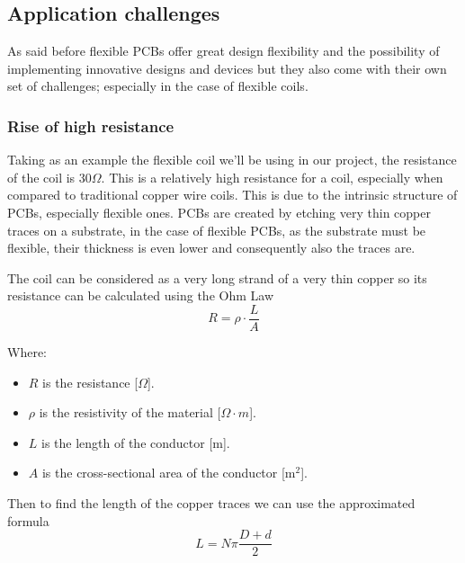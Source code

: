 \def\perm_air{4*\pi*1e-7} %
\def\spires{35}
\def\res_coil{30} %
\def\coil_ext_r{7.9e-3} %
\def\coil_int_r{1.016e-4} %



\subsection{Application challenges}
As said before flexible PCBs offer great design flexibility and the possibility of implementing innovative designs and devices but they also come with their own set of challenges; especially in the case of flexible coils.

\subsubsection{Rise of high resistance}
Taking as an example the flexible coil we'll be using in our project, the resistance of the coil is 30\(\Omega\). This is a relatively high resistance for a coil, especially when compared to traditional copper wire coils. 
This is due to the intrinsic structure of PCBs, especially flexible ones.
PCBs are created by etching very thin copper traces on a substrate, in the case of flexible PCBs, as the substrate must be flexible, their thickness is even lower and consequently also the traces are.

The coil can be considered as a very long strand of a very thin copper so its resistance can be calculated using the Ohm Law
\begin{equation}
    R=\rho \cdot \frac{L}{A}
\end{equation}

Where:
\begin{itemize}
    \item \( R \) is the resistance [\(\Omega\)].
    \item \( \rho \) is the resistivity of the material [\(\Omega \cdot m\)].
    \item \( L \) is the length of the conductor [m].
    \item \( A \) is the cross-sectional area of the conductor [m\(^2\)].
\end{itemize}

Then to find the length of the copper traces we can use the approximated formula \cite{Length_of_a_Spiral}
\begin{equation}
    L = N \pi \frac{D+d}{2}
\end{equation} 

